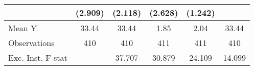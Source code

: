 {\begin{tabular}{l*{5}{c}}
            &     (2.909)         &     (2.118)         &     (2.628)         &     (1.242)         &                     \\
\midrule
Mean Y      &       33.44         &       33.44         &        1.85         &        2.04         &       33.44         \\
Observations&         410         &         410         &         411         &         411         &         410         \\
Exc. Inst. F-stat&                     &      37.707         &      30.879         &      24.109         &      14.099         \\
\bottomrule
\end{tabular}
}
